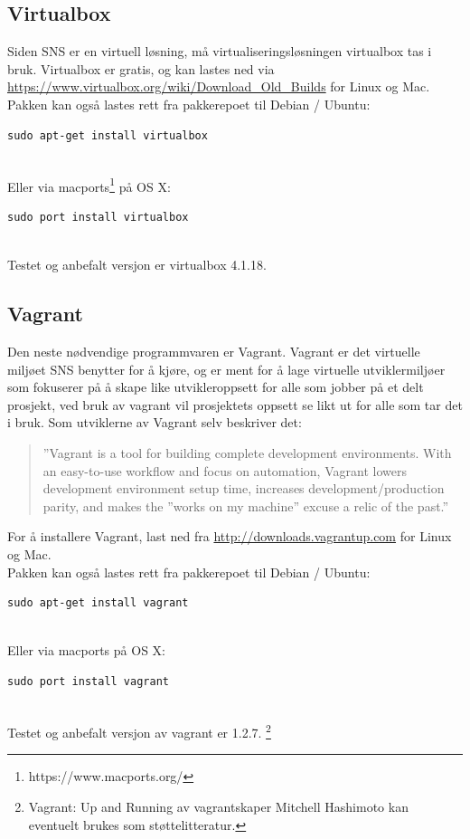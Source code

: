 \documentclass{article}
\begin{document}
\subsection{Virtualbox}
Siden SNS er en virtuell løsning, må virtualiseringsløsningen virtualbox tas i bruk. Virtualbox er gratis, og kan lastes ned via \url{https://www.virtualbox.org/wiki/Download_Old_Builds} for Linux og Mac. Pakken kan også lastes rett fra pakkerepoet til Debian / Ubuntu: \\ 
\begin{lstlisting}
sudo apt-get install virtualbox
\end{lstlisting}
\\
Eller via macports\footnote{https://www.macports.org/} på OS X:
\begin{lstlisting}
sudo port install virtualbox
\end{lstlisting}
\\
Testet og anbefalt versjon er virtualbox 4.1.18. 
\subsection{Vagrant}
Den neste nødvendige programmvaren er Vagrant. Vagrant er det virtuelle miljøet SNS benytter for å kjøre, og er ment for å lage virtuelle utviklermiljøer som fokuserer på å skape like utvikleroppsett for alle som jobber på et delt prosjekt, ved bruk av vagrant vil prosjektets oppsett se likt ut for alle som tar det i bruk. Som utviklerne av Vagrant selv beskriver det: 
\begin{quote}
''Vagrant is a tool for building complete development environments. With an easy-to-use workflow and focus on automation, Vagrant lowers development environment setup time, increases development/production parity, and makes the ''works on my machine'' excuse a relic of the past.''
\end{quote}
For å installere Vagrant, last ned fra \url{http://downloads.vagrantup.com} for Linux og Mac. \\
 Pakken kan også lastes rett fra pakkerepoet til Debian / Ubuntu: \\ 
\begin{lstlisting}
sudo apt-get install vagrant
\end{lstlisting}
\\
Eller via macports på OS X:
\begin{lstlisting}
sudo port install vagrant
\end{lstlisting}
\\
Testet og anbefalt versjon av vagrant er 1.2.7. 
\footnote{Vagrant: Up and Running av vagrantskaper Mitchell Hashimoto kan eventuelt brukes som støttelitteratur. }
\end{document}
